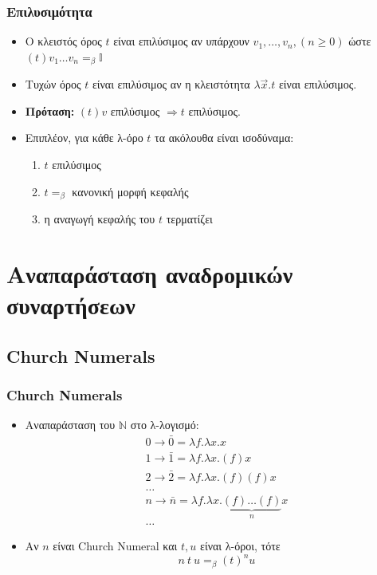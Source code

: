 \documentclass{beamer}
\begin{document}
\begin{frame}
\frametitle{Επιλυσιμότητα}
\begin{itemize}
\item Ο κλειστός όρος $t$ είναι επιλύσιμος αν υπάρχουν $v_1, \ldots, v_n, (n \geqslant 0)$ ώστε
 $ (t) v_1 \ldots v_n =_\beta \mathbb{I} $ \pause
 \item Τυχών όρος $t$ είναι επιλύσιμος αν η κλειστότητα $\lambda \overrightarrow{x} . t$ είναι επιλύσιμος. \pause
 \item \textbf{Πρόταση:} $(t) v$ επιλύσιμος $ \Rightarrow t$ επιλύσιμος. \pause
 \item Επιπλέον, για κάθε λ-όρο $t$ τα ακόλουθα είναι ισοδύναμα:
 	\begin{enumerate}
 	\item $t$ επιλύσιμος
 	\item $t =_\beta$ κανονική μορφή κεφαλής
 	\item η αναγωγή κεφαλής του $t$ τερματίζει 	
 	\end{enumerate}
\end{itemize}
\end{frame}

\section{Αναπαράσταση αναδρομικών συναρτήσεων}

\subsection{Church Numerals}

\begin{frame}
        \frametitle{Church Numerals}
        \begin{itemize}
                \item Αναπαράσταση του $ \mathbb{N} $ στο λ-λογισμό:
                \pause
	        	$$ \begin{array}{l}
	        		0 \rightarrow \bar{0} = \lambda f . \lambda x . x \\
	        		1 \rightarrow \bar{1} = \lambda f . \lambda x . (f) x \\
	        		2 \rightarrow \bar{2} = \lambda f . \lambda x . (f) (f) x \\
	        		\ldots \\
	        		n \rightarrow \bar{n} = \lambda f . \lambda x . \underbrace{(f) \ldots (f)}_n x \\
	        		\ldots
	        	\end{array} $$
	        	\pause
                \item Αν $n $ είναι Church Numeral και $t, u$ είναι λ-όροι, τότε
                $$ n\:t\:u =_\beta (t)^n u $$
        \end{itemize}
\end{frame}
\end{document}
